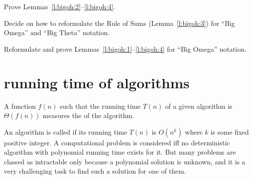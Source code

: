 \begin{Exercise}\label{exr:bigoh:features}
Prove Lemmas~\ref{l:bigoh:2}--\ref{l:bigoh:4}.
\end{Exercise}

\begin{Exercise}\label{exr:bigomega:sums}
Decide on how to reformulate the Rule of Sums (Lemma~\ref{l:bigoh:3})
for ``Big Omega'' and ``Big Theta'' notation.
\end{Exercise}

\begin{Exercise}\label{exr:bigomega:lem}
Reformulate and prove Lemmas~\ref{l:bigoh:1}--\ref{l:bigoh:4}
for ``Big Omega'' notation. 
\end{Exercise}

\section{running time of algorithms} 
\label{time-compl}

\begin{Definition} [Informal]
A function $f(n)$ such that the running time $T(n)$ of a given 
algorithm is $\Theta(f(n))$ measures the  
of the algorithm.
\end{Definition}

An algorithm is called  if its running time $T(n)$
is $O(n^{k})$ where $k$ is some fixed positive integer. A computational
problem is considered  iff no deterministic
algorithm with polynomial running time exists for it. But many problems
are classed as intractable only because a polynomial solution is unknown,
and it is a very challenging task to find such a solution for one of them.
 
